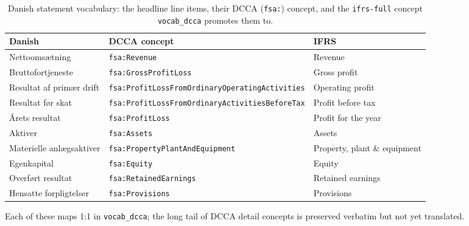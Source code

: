 \documentclass[11pt,a4paper]{report}
\begin{document}
\begin{table}[h]
\centering
\footnotesize
\caption{Danish statement vocabulary: the headline line items, their DCCA (\texttt{fsa:}) concept, and the
\texttt{ifrs-full} concept \texttt{vocab\_dcca} promotes them to.}
\label{tab:dk-vocab}
\begin{tabular}{@{}p{}p{}p{}@{}}
\toprule
\textbf{Danish} & \textbf{DCCA concept} & \textbf{IFRS} \\
\midrule
Nettoomsætning & \texttt{fsa:Revenue} & Revenue \\
Bruttofortjeneste & \texttt{fsa:GrossProfitLoss} & Gross profit \\
Resultat af primær drift & \texttt{fsa:ProfitLossFromOrdinaryOperatingActivities} & Operating profit \\
Resultat før skat & \texttt{fsa:ProfitLossFromOrdinaryActivitiesBeforeTax} & Profit before tax \\
\AA rets resultat & \texttt{fsa:ProfitLoss} & Profit for the year \\
Aktiver & \texttt{fsa:Assets} & Assets \\
Materielle anl\ae gsaktiver & \texttt{fsa:PropertyPlantAndEquipment} & Property, plant \& equipment \\
Egenkapital & \texttt{fsa:Equity} & Equity \\
Overf\o rt resultat & \texttt{fsa:RetainedEarnings} & Retained earnings \\
Hensatte forpligtelser & \texttt{fsa:Provisions} & Provisions \\
\bottomrule
\end{tabular}
\end{table}

\noindent Each of these maps 1:1 in \texttt{vocab\_dcca}; the long tail of DCCA detail concepts is preserved
verbatim but not yet translated.
\end{document}

